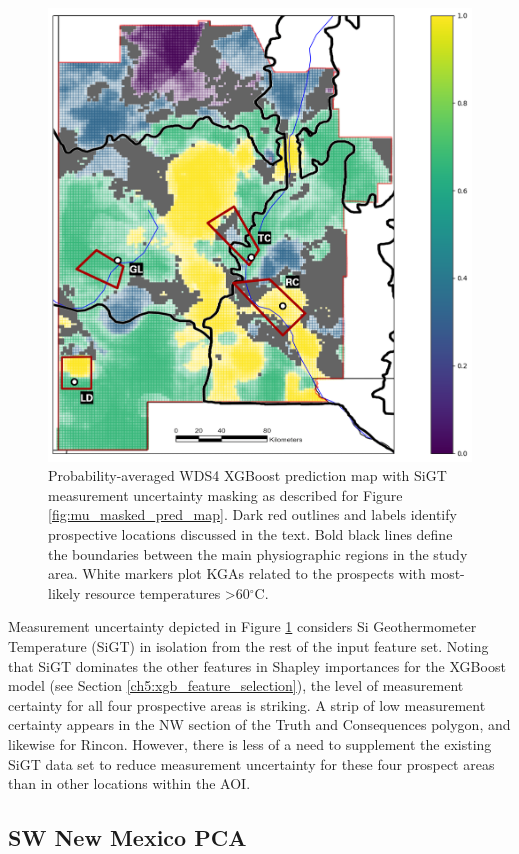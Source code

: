 \begin{figure}
\centering
\includegraphics[width=.75\textwidth]{templates/images/Figure-MU_Masked_Average_Gradient_Map_Prospect_Zones.png}
\caption[Measurement uncertainty map with prospective areas]
{Probability-averaged WDS4 XGBoost prediction map with SiGT measurement uncertainty masking as described for Figure \ref{fig:mu_masked_pred_map}. Dark red outlines and labels identify prospective locations discussed in the text. Bold black lines define the boundaries between the main physiographic regions in the study area. White markers plot KGAs related to the prospects with most-likely resource temperatures >60$^\circ$C.}
\label{fig:measure_uncertainty_prospects}
\end{figure}

Measurement uncertainty depicted in Figure \ref{fig:measure_uncertainty_prospects} considers Si Geothermometer Temperature (SiGT) in isolation from the rest of the input feature set. Noting that SiGT dominates the other features in Shapley importances for the XGBoost model (see Section \ref{ch5:xgb_feature_selection}), the level of measurement certainty for all four prospective areas is striking. A strip of low measurement certainty appears in the NW section of the Truth and Consequences polygon, and likewise for Rincon. However, there is less of a need to supplement the existing SiGT data set to reduce measurement uncertainty for these four prospect areas than in other locations within the AOI.

\subsection{SW New Mexico PCA}

